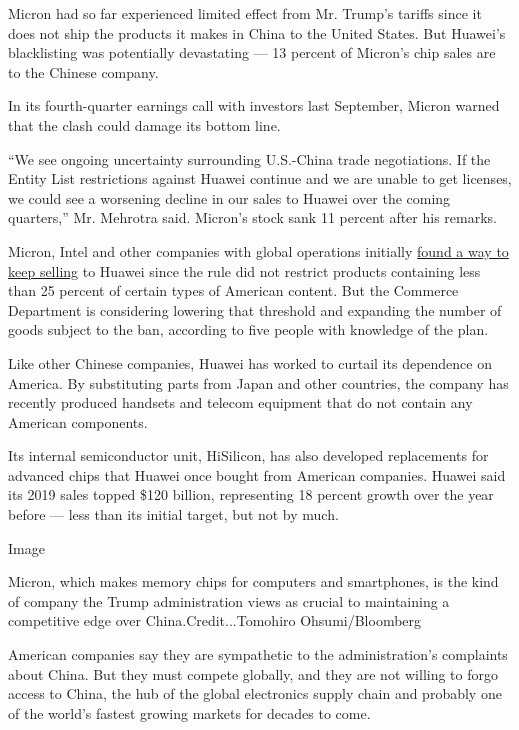 Micron had so far experienced limited effect from Mr. Trump's tariffs
since it does not ship the products it makes in China to the United
States. But Huawei's blacklisting was potentially devastating --- 13
percent of Micron's chip sales are to the Chinese company.

In its fourth-quarter earnings call with investors last September,
Micron warned that the clash could damage its bottom line.

``We see ongoing uncertainty surrounding U.S.-China trade negotiations.
If the Entity List restrictions against Huawei continue and we are
unable to get licenses, we could see a worsening decline in our sales to
Huawei over the coming quarters,'' Mr. Mehrotra said. Micron's stock
sank 11 percent after his remarks.

Micron, Intel and other companies with global operations initially
\href{https://www.nytimes.com/2019/06/25/technology/huawei-trump-ban-technology.html}{found
a way to keep selling} to Huawei since the rule did not restrict
products containing less than 25 percent of certain types of American
content. But the Commerce Department is considering lowering that
threshold and expanding the number of goods subject to the ban,
according to five people with knowledge of the plan.

Like other Chinese companies, Huawei has worked to curtail its
dependence on America. By substituting parts from Japan and other
countries, the company has recently produced handsets and telecom
equipment that do not contain any American components.

Its internal semiconductor unit, HiSilicon, has also developed
replacements for advanced chips that Huawei once bought from American
companies. Huawei said its 2019 sales topped \$120 billion, representing
18 percent growth over the year before --- less than its initial target,
but not by much.

Image

Micron, which makes memory chips for computers and smartphones, is the
kind of company the Trump administration views as crucial to maintaining
a competitive edge over China.Credit...Tomohiro Ohsumi/Bloomberg

American companies say they are sympathetic to the administration's
complaints about China. But they must compete globally, and they are not
willing to forgo access to China, the hub of the global electronics
supply chain and probably one of the world's fastest growing markets for
decades to come.

